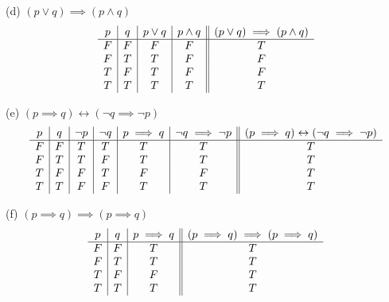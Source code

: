 \documentclass[addpoints]{exam}
\begin{document}
\begin{sloppypar}
\begin{questions}
\begin{solution}
        (d) $ (p \lor q) \implies (p \land q) $
        \[ 
        \begin{array}{c | c | c | c || c}
            p & q & p \lor q & p \land q & (p \lor q) \implies (p \land q) \\ 
            \hline
            F & F & F & F & T    \\ 
            F & T & T & F & F    \\
            T & F & T & F & F    \\
            T & T & T & T & T
        \end{array}
        \]

        (e) $ (p \implies q) \leftrightarrow (\neg q \implies \neg p) $
        \[ 
        \begin{array}{c | c | c | c | c | c || c}
            p & q & \neg p & \neg q & p \implies q & \neg q \implies \neg p & (p \implies q) \leftrightarrow (\neg q \implies \neg p) \\ 
            \hline
            F & F & T & T & T & T & T      \\ 
            F & T & T & F & T & T & T      \\
            T & F & F & T & F & F & T      \\ 
            T & T & F & F & T & T & T      
        \end{array}
        \]

        (f) $ (p \implies q) \implies (p \implies q) $
        \[ 
        \begin{array}{c | c | c || c}
            p & q & p \implies q & (p \implies q) \implies (p \implies q) \\ 
            \hline
            F & F & T & T     \\ 
            F & T & T & T     \\ 
            T & F & F & T     \\ 
            T & T & T & T
        \end{array}
        \]

    \end{solution}
\end{questions}


\end{sloppypar}
\end{document}
